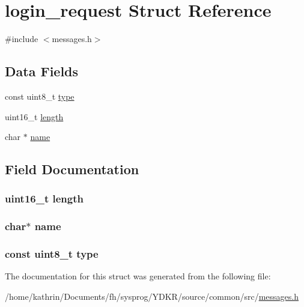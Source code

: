 \hypertarget{structlogin__request}{
\section{login\_\-request Struct Reference}
\label{structlogin__request}
}


{\ttfamily \#include $<$messages.h$>$}

\subsection*{Data Fields}
\begin{DoxyCompactItemize}
\item 
const uint8\_\-t \hyperlink{structlogin__request_aca7dafb0092715a03dd40f45fc607f2a}{type}
\item 
uint16\_\-t \hyperlink{structlogin__request_a1892eba2086d12ac2b09005aeb09ea3b}{length}
\item 
char $\ast$ \hyperlink{structlogin__request_a5ac083a645d964373f022d03df4849c8}{name}
\end{DoxyCompactItemize}


\subsection{Field Documentation}
\hypertarget{structlogin__request_a1892eba2086d12ac2b09005aeb09ea3b}{
\subsubsection[{length}]{\setlength{\rightskip}{0pt plus 5cm}uint16\_\-t {\bf length}}}
\label{structlogin__request_a1892eba2086d12ac2b09005aeb09ea3b}
\hypertarget{structlogin__request_a5ac083a645d964373f022d03df4849c8}{
\subsubsection[{name}]{\setlength{\rightskip}{0pt plus 5cm}char$\ast$ {\bf name}}}
\label{structlogin__request_a5ac083a645d964373f022d03df4849c8}
\hypertarget{structlogin__request_aca7dafb0092715a03dd40f45fc607f2a}{
\subsubsection[{type}]{\setlength{\rightskip}{0pt plus 5cm}const uint8\_\-t {\bf type}}}
\label{structlogin__request_aca7dafb0092715a03dd40f45fc607f2a}


The documentation for this struct was generated from the following file:\begin{DoxyCompactItemize}
\item 
/home/kathrin/Documents/fh/sysprog/YDKR/source/common/src/\hyperlink{messages_8h}{messages.h}\end{DoxyCompactItemize}
